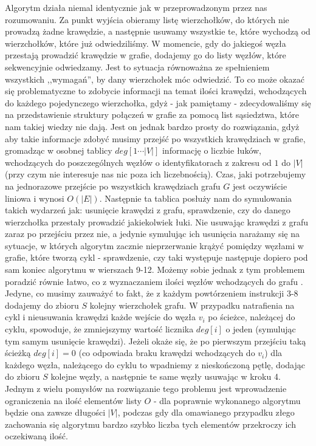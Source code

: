 Algorytm działa niemal identycznie jak w przeprowadzonym przez nas rozumowaniu. Za punkt wyjścia obieramy listę wierzchołków, do których nie prowadzą żadne krawędzie, a następnie usuwamy wszystkie te, które wychodzą od wierzchołków, które już odwiedziliśmy. W momencie, gdy do jakiegoś węzła przestają prowadzić krawędzie w grafie, dodajemy go do listy węzłów, które sekwencyjnie odwiedzamy. Jest to sytuacja równoważna ze spełnieniem wszystkich ,,wymagań'', by dany wierzchołek móc odwiedzić. To co może okazać się problematyczne to zdobycie informacji na temat ilości krawędzi, wchodzących do każdego pojedynczego wierzchołka, gdyż - jak pamiętamy - zdecydowaliśmy się na przedstawienie struktury połączeń w grafie za pomocą list sąsiedztwa, które nam takiej wiedzy nie dają. Jest on jednak bardzo prosty do rozwiązania, gdyż aby takie informacje zdobyć musimy przejść po wszystkich krawędziach w grafie, gromadząc w osobnej tablicy $deg \left[1 \cdots \left| V \right| \right]$ informację o liczbie łuków, wchodzących do poszczególnych węzłów o identyfikatorach z zakresu od $1$ do $\left| V \right|$ (przy czym nie interesuje nas nic poza ich liczebnością). Czas, jaki potrzebujemy na jednorazowe przejście po wszystkich krawędziach grafu $G$ jest oczywiście liniowa i wynosi $O \left( \left| E \right| \right) $. Następnie ta tablica posłuży nam do symulowania takich wydarzeń jak: usunięcie krawędzi z grafu, sprawdzenie, czy do danego wierzchołka przestały prowadzić jakiekolwiek łuki. Nie usuwając krawędzi z grafu zaraz po przejściu przez nie, a jedynie symulując ich usunięcia narażamy się na sytuacje, w których algorytm zacznie nieprzerwanie krążyć pomiędzy węzłami w grafie, które tworzą cykl - sprawdzenie, czy taki występuje następuje dopiero pod sam koniec algorytmu w wierszach 9-12. Możemy sobie jednak z tym problemem poradzić równie łatwo, co z wyznaczaniem ilości węzłów wchodzących do grafu . Jedyne, co musimy zauważyć to fakt, że z każdym powtórzeniem instrukcji 3-8 dodajemy do zbioru $S$ kolejny wierzchołek grafu. W przypadku natrafienia na cykl i nieusuwania krawędzi każde wejście do węzła $v_{i}$ po ścieżce, należącej do cyklu, spowoduje, że zmniejszymy wartość licznika $deg \left[ i \right]$ o jeden (symulując tym samym usunięcie krawędzi). Jeżeli okaże się, że po pierwszym przejściu taką ścieżką $deg \left[ i \right] = 0 $ (co odpowiada braku krawędzi wchodzących do $v_{i}$) dla każdego węzła, należącego do cyklu to wpadniemy z nieskończoną pętlę, dodając do zbioru $S$ kolejne węzły, a następnie te same węzły usuwając w kroku 4. Jednym z wielu pomysłów na rozwiązanie tego problemu jest wprowadzenie ograniczenia na ilość elementów listy $O$ - dla poprawnie wykonanego algorytmu będzie ona zawsze długości $ \left| V \right| $, podczas gdy dla omawianego przypadku złego zachowania się algorytmu bardzo szybko liczba tych elementów przekroczy ich oczekiwaną ilość.


